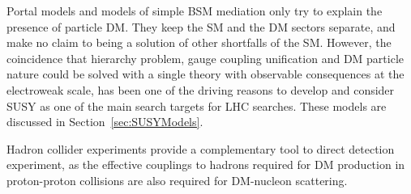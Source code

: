 \begin{marginnote}[]
\end{marginnote}





Portal models and models of simple BSM mediation only try to explain the presence of particle DM. They keep the SM and the DM sectors separate, and make no claim to being a solution of other shortfalls of the SM. However, the coincidence that hierarchy problem, gauge coupling unification and DM particle nature could be solved with a single theory with observable consequences at the electroweak scale, has been one of the driving reasons to develop and consider SUSY as one of the main search targets for LHC searches. These models are discussed in Section~\ref{sec:SUSYModels}.



Hadron collider experiments provide a complementary tool to direct detection experiment, as the effective couplings to hadrons required for DM production in proton-proton collisions are also required for DM-nucleon scattering. %




